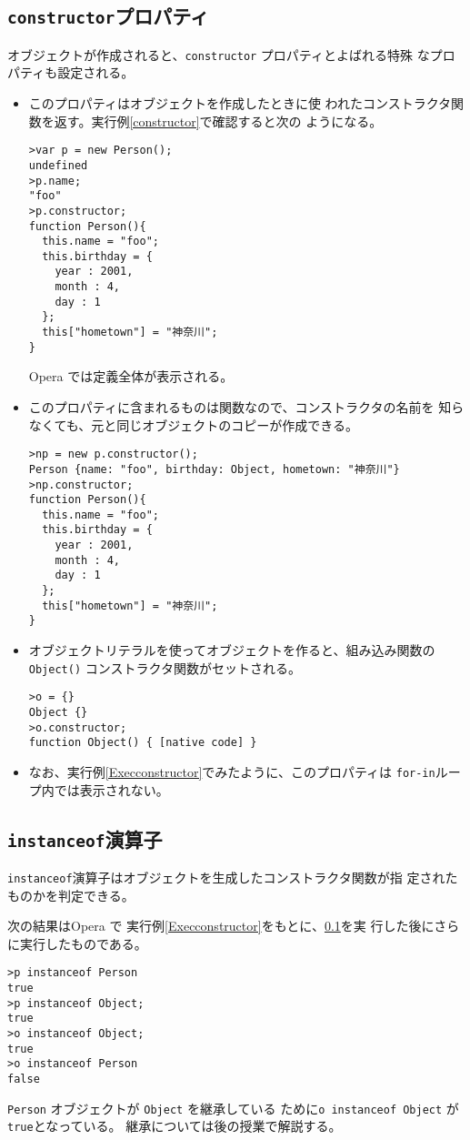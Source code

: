 \subsection{\protect\texttt{constructor}プロパティ}\label{constructorProp}
オブジェクトが作成されると、\verb+constructor+ プロパティとよばれる特殊
なプロパティも設定される。
\begin{itemize}
 \item このプロパティはオブジェクトを作成したときに使
われたコンストラクタ関数を返す。実行例\ref{constructor}で確認すると次の
       ようになる。
\begin{Verbatim}
>var p = new Person();
undefined
>p.name;
"foo"
>p.constructor;
function Person(){
  this.name = "foo";
  this.birthday = {
    year : 2001,
    month : 4,
    day : 1
  };
  this["hometown"] = "神奈川";
}
\end{Verbatim}
Opera では定義全体が表示される。
 \item このプロパティに含まれるものは関数なので、コンストラクタの名前を
       知らなくても、元と同じオブジェクトのコピーが作成できる。
\begin{Verbatim}
>np = new p.constructor();
Person {name: "foo", birthday: Object, hometown: "神奈川"}
>np.constructor;
function Person(){
  this.name = "foo";
  this.birthday = {
    year : 2001,
    month : 4,
    day : 1
  };
  this["hometown"] = "神奈川";
}
\end{Verbatim}
 \item オブジェクトリテラルを使ってオブジェクトを作ると、組み込み関数の
       \verb+Object()+ コンストラクタ関数がセットされる。
\begin{Verbatim}
>o = {}
Object {}
>o.constructor;
function Object() { [native code] }
\end{Verbatim}
 \item なお、実行例\ref{Execconstructor}でみたように、このプロパティは
       \verb+for-in+ループ内では表示されない。
\end{itemize}
\fi
\subsection{\protect\texttt{instanceof}演算子}
\texttt{instanceof}演算子はオブジェクトを生成したコンストラクタ関数が指
定されたものかを判定できる。
\begin{Exec}\upshape
次の結果はOpera で 実行例\ref{Execconstructor}をもとに、\ref{constructorProp}を実
 行した後にさらに実行したものである。
\begin{Verbatim}
>p instanceof Person
true
>p instanceof Object;
true
>o instanceof Object;
true
>o instanceof Person
false
\end{Verbatim}
 \iffalse
 \verb+p instanceof Object+ の結果が教科書と違い、\verb+true+ になってい
 る。
 \fi
  \verb+Person+ オブジェクトが \verb+Object+ を継承している
 ために\texttt{o instanceof Object} が\texttt{true}となっている。
 継承については後の授業で解説する。
 \end{Exec}
\iffalse
